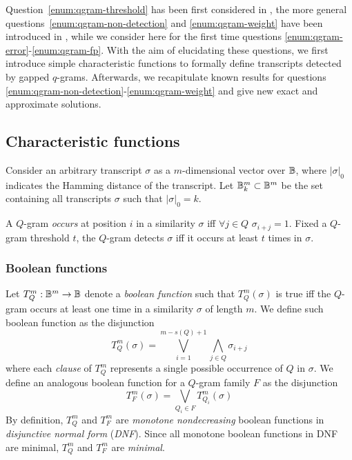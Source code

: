 Question~\ref{enum:qgram-threshold} has been first considered in \citep{Burkhardt2001,Kucherov2005},
the more general questions~\ref{enum:qgram-non-detection} and \ref{enum:qgram-weight} have been introduced in \citep{Nicolas2005}, while we consider here for the first time questions \ref{enum:qgram-error}-\ref{enum:qgram-fp}.
With the aim of elucidating these questions, we first introduce simple characteristic functions to formally define transcripts detected by gapped $q$-grams.
Afterwards, we recapitulate known results for questions \ref{enum:qgram-non-detection}-\ref{enum:qgram-weight} and give new exact and approximate solutions.

\subsection{Characteristic functions}

Consider an arbitrary transcript $\sigma$ as a $m$-dimensional vector over $\mathbb {B}$, where $|\sigma|_0$ indicates the Hamming distance of the transcript.
Let $\mathbb {B}^m_k \subset \mathbb {B}^m$ be the set containing all transcripts $\sigma$ such that $|\sigma|_0 = k$.

\begin{definition}
A $Q$-gram \emph{occurs} at position $i$ in a similarity $\sigma$ iff $\forall j \in Q$ $\sigma_{i+j}=1$.
Fixed a $Q$-gram threshold $t$, the $Q$-gram detects $\sigma$ iff it occurs at least $t$ times in $\sigma$.
\end{definition}

\subsubsection{Boolean functions}

Let $T_{Q}^{m}: \mathbb {B}^m \rightarrow \mathbb {B}$ denote a \emph{boolean function} such that $T_{Q}^{m}(\sigma)$ is true iff the $Q$-gram occurs at least one time in a similarity $\sigma$ of length $m$.
We define such boolean function as the disjunction
\begin{equation}
\label{eq:qgram-bool}
T_{Q}^{m}(\sigma) = \bigvee_{i=1}^{m-s(Q)+1} \bigwedge_{j \in Q} \sigma_{i+j}
\end{equation}
where each \emph{clause} of $T_{Q}^{m}$ represents a single possible occurrence of $Q$ in $\sigma$.
We define an analogous boolean function for a $Q$-gram family $F$ as the disjunction
\begin{equation}
\label{eq:family-bool}
T_{F}^{m}(\sigma) = \bigvee_{Q_i \in F} T_{Q_i}^{m}(\sigma)
\end{equation}
By definition, $T_{Q}^{m}$ and $T_{F}^{m}$ are \emph{monotone nondecreasing} boolean functions in \emph{disjunctive normal form} (\emph{DNF}).
Since all monotone boolean functions in DNF are minimal, $T_{Q}^{m}$ and $T_{F}^{m}$ are \emph{minimal}.

